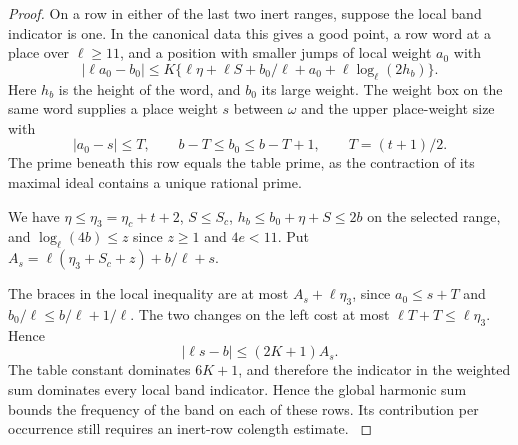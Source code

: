 \begin{proof}
On a row in either of the last two inert ranges, suppose the
local band indicator is one. In the canonical data this gives
a good point, a row word at a place over \(\ell\ge11\), and
a position with smaller jumps of local weight \(a_0\) with
\[
 |\ell a_0-b_0|\le K\{\ell\eta+\ell S+b_0/\ell+a_0+
                                          \ell\log_\ell(2h_b)\}.
\]
Here \(h_b\) is the height of the word, and \(b_0\) its large
weight. The weight box on the same word supplies a place weight
\(s\) between \(\omega\) and the upper place-weight size with
\[
 |a_0-s|\le T,\qquad b-T\le b_0\le b-T+1,\qquad T=(t+1)/2 .
\]
The prime beneath this row equals the table prime, as the
contraction of its maximal ideal contains a unique rational
prime.

We have \(\eta\le\eta_3=\eta_c+t+2\),
\(S\le S_c\), \(h_b\le b_0+\eta+S\le 2b\) on the
selected range, and \(\log_\ell(4b)\le z\) since \(z\ge1\)
and \(4e<11\). Put \(A_s=\ell(\eta_3+S_c+z)+b/\ell+s\).

The braces in the local inequality are at most
\(A_s+\ell\eta_3\), since \(a_0\le s+T\) and
\(b_0/\ell\le b/\ell+1/\ell\).
The two changes on the left cost at most
\(\ell T+T\le\ell\eta_3\). Hence
\[
                 |\ell s-b|\le(2K+1)A_s .
\]
The table constant dominates \(6K+1\), and therefore the
indicator in the weighted sum dominates every local band
indicator. Hence the global harmonic sum bounds the frequency of the band on each of these rows. Its contribution per occurrence still requires an inert-row colength estimate.
\label{cor:unramified-split-length-7}
\end{proof}

